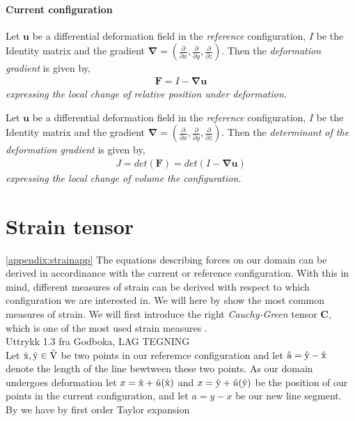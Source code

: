 \begin{appendices}
\subsubsection*{Current configuration}
\begin{defn}
Let $\mathbf{u}$ be a differential deformation field in the \textit{reference} configuration, $I$ be the Identity matrix and
the gradient $\mathbf{\nabla} = (\frac{\partial}{\partial x}, \frac{\partial}{\partial y}, \frac{\partial}{\partial z}) $. Then the \textit{deformation gradient} is given by,
\begin{align}
\mathbf{F} = I - \mathbf{\nabla} \mathbf{u} 
\end{align} 
\textit{expressing the local change of relative position under deformation.}
\end{defn}

\begin{defn}
Let $\mathbf{u}$ be a differential deformation field in the \textit{reference} configuration, $I$ be the Identity matrix and
the gradient $\mathbf{\nabla} = (\frac{\partial}{\partial x}, \frac{\partial}{\partial y}, \frac{\partial}{\partial z}) $. Then the \textit{determinant of the deformation gradient} is given by,
\begin{align}
J = det(\mathbf{F}) = det( I - \mathbf{\nabla} \mathbf{u} )
\end{align} 
\textit{expressing the local change of volume the configuration.}
\end{defn}


\chapter{Strain tensor}
\ref{appendix:strainapp}
The equations describing forces on our domain can be derived in accordinance with the current or reference configuration. With this in mind, different measures of strain can be derived with respect to which configuration we are interested in. We will here by \cite{Richter2016} show the most common measures of strain. We will first introduce the right \textit{Cauchy-Green} tensor \textbf{C}, which is one of the most used strain measures \cite{Wriggers2006}. \\ Uttrykk 1.3 fra Godboka, LAG TEGNING \\ 

Let $\text{\^{x}}, \text{\^{y}} \in \text{\^{V}}$ be two points in our referemce configuration and let $\text{\^{a}} = \text{\^{y}} - \text{\^{x}}$ denote the
length of the line bewtween these two points. As our domain undergoes deformation let 
$x = \text{\^{x}} + \hat{u}( \text{\^{x}} ) $ and $x = \text{\^{y}} + \hat{u}( \text{\^{y}} )  $ be the position of our points in the current configuration, and let $a = y - x$ be our new line segment. By \cite{Richter2016} we have by first order Taylor expansion


\end{appendices}
